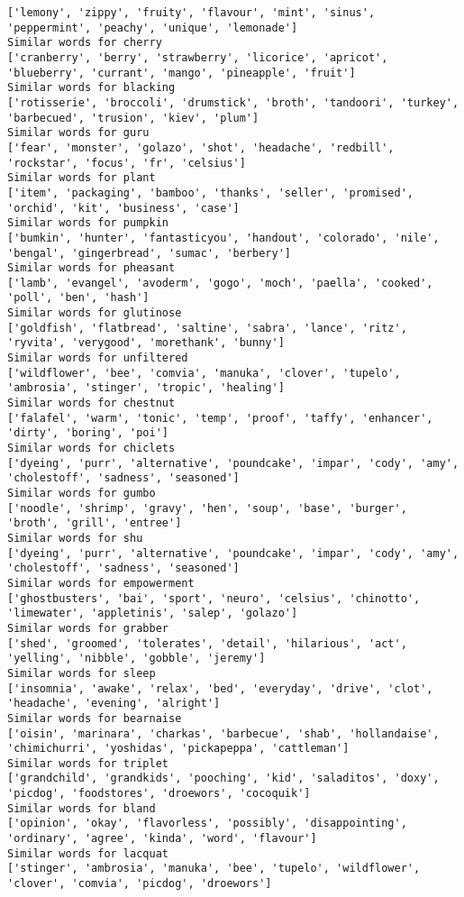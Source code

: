 \documentclass[11pt]{article}
\begin{document}
\begin{Verbatim}[commandchars=\\\{\}]
['lemony', 'zippy', 'fruity', 'flavour', 'mint', 'sinus', 'peppermint', 'peachy', 'unique', 'lemonade']
Similar words for cherry
['cranberry', 'berry', 'strawberry', 'licorice', 'apricot', 'blueberry', 'currant', 'mango', 'pineapple', 'fruit']
Similar words for blacking
['rotisserie', 'broccoli', 'drumstick', 'broth', 'tandoori', 'turkey', 'barbecued', 'trusion', 'kiev', 'plum']
Similar words for guru
['fear', 'monster', 'golazo', 'shot', 'headache', 'redbill', 'rockstar', 'focus', 'fr', 'celsius']
Similar words for plant
['item', 'packaging', 'bamboo', 'thanks', 'seller', 'promised', 'orchid', 'kit', 'business', 'case']
Similar words for pumpkin
['bumkin', 'hunter', 'fantasticyou', 'handout', 'colorado', 'nile', 'bengal', 'gingerbread', 'sumac', 'berbery']
Similar words for pheasant
['lamb', 'evangel', 'avoderm', 'gogo', 'moch', 'paella', 'cooked', 'poll', 'ben', 'hash']
Similar words for glutinose
['goldfish', 'flatbread', 'saltine', 'sabra', 'lance', 'ritz', 'ryvita', 'verygood', 'morethank', 'bunny']
Similar words for unfiltered
['wildflower', 'bee', 'comvia', 'manuka', 'clover', 'tupelo', 'ambrosia', 'stinger', 'tropic', 'healing']
Similar words for chestnut
['falafel', 'warm', 'tonic', 'temp', 'proof', 'taffy', 'enhancer', 'dirty', 'boring', 'poi']
Similar words for chiclets
['dyeing', 'purr', 'alternative', 'poundcake', 'impar', 'cody', 'amy', 'cholestoff', 'sadness', 'seasoned']
Similar words for gumbo
['noodle', 'shrimp', 'gravy', 'hen', 'soup', 'base', 'burger', 'broth', 'grill', 'entree']
Similar words for shu
['dyeing', 'purr', 'alternative', 'poundcake', 'impar', 'cody', 'amy', 'cholestoff', 'sadness', 'seasoned']
Similar words for empowerment
['ghostbusters', 'bai', 'sport', 'neuro', 'celsius', 'chinotto', 'limewater', 'appletinis', 'salep', 'golazo']
Similar words for grabber
['shed', 'groomed', 'tolerates', 'detail', 'hilarious', 'act', 'yelling', 'nibble', 'gobble', 'jeremy']
Similar words for sleep
['insomnia', 'awake', 'relax', 'bed', 'everyday', 'drive', 'clot', 'headache', 'evening', 'alright']
Similar words for bearnaise
['oisin', 'marinara', 'charkas', 'barbecue', 'shab', 'hollandaise', 'chimichurri', 'yoshidas', 'pickapeppa', 'cattleman']
Similar words for triplet
['grandchild', 'grandkids', 'pooching', 'kid', 'saladitos', 'doxy', 'picdog', 'foodstores', 'droewors', 'cocoquik']
Similar words for bland
['opinion', 'okay', 'flavorless', 'possibly', 'disappointing', 'ordinary', 'agree', 'kinda', 'word', 'flavour']
Similar words for lacquat
['stinger', 'ambrosia', 'manuka', 'bee', 'tupelo', 'wildflower', 'clover', 'comvia', 'picdog', 'droewors']

\end{Verbatim}
\end{document}
